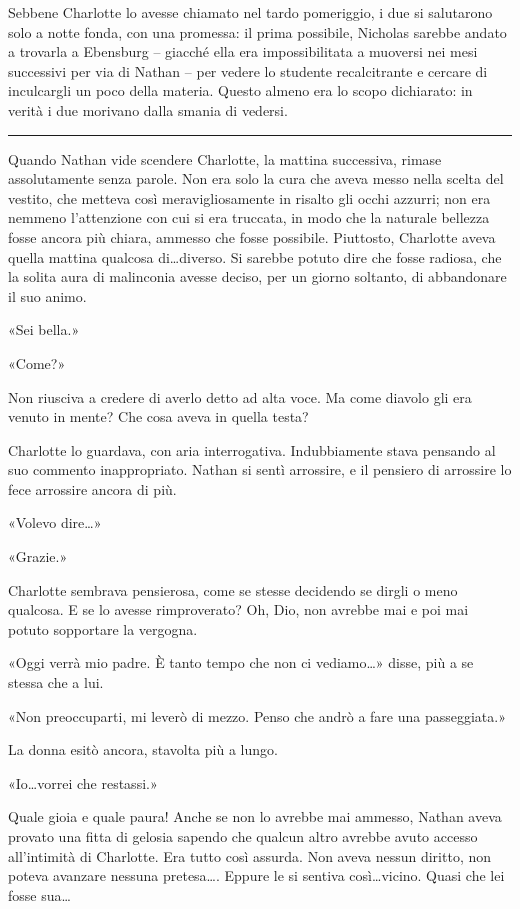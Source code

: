 \documentclass[a4paper,oneside,11pt]{memoir}
\begin{document}
Sebbene Charlotte lo avesse chiamato nel tardo pomeriggio, i due si salutarono
solo a notte fonda, con una promessa: il prima possibile, Nicholas sarebbe
andato a trovarla a Ebensburg -- giacché ella era impossibilitata a muoversi nei
mesi successivi per via di Nathan -- per vedere lo studente recalcitrante e
cercare di inculcargli un poco della materia. Questo almeno era lo scopo
dichiarato: in verità i due morivano dalla smania di vedersi.

\plainbreak{1}

Quando Nathan vide scendere Charlotte, la mattina successiva, rimase assolutamente senza parole. Non
era solo la cura che aveva messo nella scelta del vestito, che metteva così meravigliosamente in
risalto gli occhi azzurri; non era nemmeno l'attenzione con cui si era truccata, in modo che la
naturale bellezza fosse ancora più chiara, ammesso che fosse possibile. Piuttosto, Charlotte aveva
quella mattina qualcosa di\dots diverso. Si sarebbe potuto dire che fosse radiosa, che la solita aura di
malinconia avesse deciso, per un giorno soltanto, di abbandonare il suo animo.

«Sei bella.»

«Come?»

Non riusciva a credere di averlo detto ad alta voce. Ma come diavolo gli era venuto in mente? Che
cosa aveva in quella testa?

Charlotte lo guardava, con aria interrogativa. Indubbiamente stava pensando al suo commento
inappropriato. Nathan si sentì arrossire, e il pensiero di arrossire lo fece arrossire ancora di
più.

«Volevo dire\dots»

«Grazie.»

Charlotte sembrava pensierosa, come se stesse decidendo se dirgli o meno qualcosa. E se lo avesse
rimproverato? Oh, Dio, non avrebbe mai e poi mai potuto sopportare la vergogna.

«Oggi verrà mio padre. È tanto tempo che non ci vediamo\dots» disse, più a se stessa che a lui.

«Non preoccuparti, mi leverò di mezzo. Penso che andrò a fare una passeggiata.»

La donna esitò ancora, stavolta più a lungo.

«Io\dots vorrei che restassi.»

Quale gioia e quale paura! Anche se non lo avrebbe mai ammesso, Nathan aveva provato una fitta di
gelosia sapendo che qualcun altro avrebbe avuto accesso all'intimità di Charlotte. Era tutto così
assurda. Non aveva nessun diritto, non poteva avanzare nessuna pretesa\dots. Eppure le si sentiva
così\dots vicino. Quasi che lei fosse sua\dots
\end{document}
